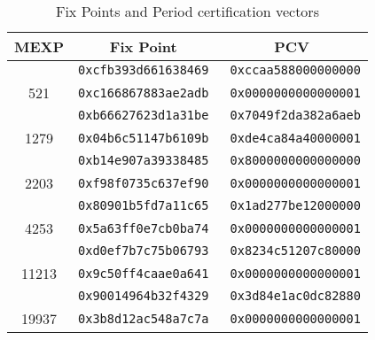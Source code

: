 \documentclass{svmult}
\begin{document}

\begin{table}
  \begin{center}
    \caption{Fix Points and Period certification vectors}
    \label{tab:pcv}
    \begin{tabular}{c|rr} \hline
      MEXP & \multicolumn{1}{c}{Fix Point} 
      & \multicolumn{1}{c}{PCV} \\ \hline \hline
      & \texttt{0xcfb393d661638469} & \texttt{0xccaa588000000000} \\
      521 & \texttt{0xc166867883ae2adb} &\texttt{ 0x0000000000000001} \\ \hline
      & \texttt{0xb66627623d1a31be} & \texttt{0x7049f2da382a6aeb} \\
      1279 & \texttt{0x04b6c51147b6109b} & \texttt{0xde4ca84a40000001} \\ \hline
      & \texttt{0xb14e907a39338485} & \texttt{0x8000000000000000} \\
      2203 & \texttt{0xf98f0735c637ef90} & \texttt{0x0000000000000001} \\ \hline
      & \texttt{0x80901b5fd7a11c65} & \texttt{0x1ad277be12000000} \\
      4253 & \texttt{0x5a63ff0e7cb0ba74} & \texttt{0x0000000000000001} \\ \hline
      & \texttt{0xd0ef7b7c75b06793} & \texttt{0x8234c51207c80000} \\
      11213 & \texttt{0x9c50ff4caae0a641} & \texttt{0x0000000000000001}\\ \hline
      & \texttt{0x90014964b32f4329} & \texttt{0x3d84e1ac0dc82880} \\
      19937 & \texttt{0x3b8d12ac548a7c7a} & \texttt{0x0000000000000001} \\ 
      \hline
    \end{tabular}
  \end{center}
\end{table}

\end{document}
